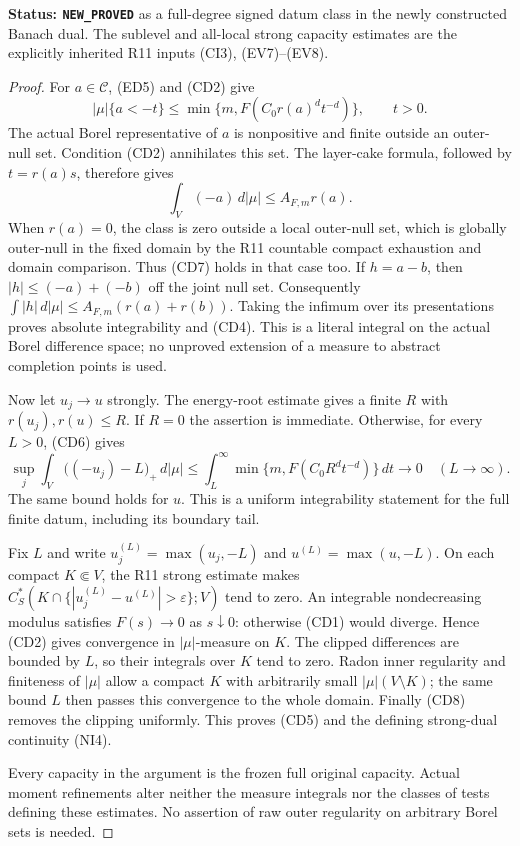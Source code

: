 \noindent\textbf{Status: \texttt{NEW\_PROVED}} as a
full-degree signed datum class in the newly constructed Banach
dual. The sublevel and all-local strong capacity estimates are
the explicitly inherited R11 inputs (CI3), (EV7)--(EV8).

\begin{proof}
For $a\in\mathscr C$, (ED5) and (CD2) give
\[
       |\mu|\{a<-t\}
       \leq \min\{m,F(C_0r(a)^d t^{-d})\},\qquad t>0.
 \tag{CD6}
\]
The actual Borel representative of $a$ is nonpositive and finite
outside an outer-null set. Condition (CD2) annihilates this set.
The layer-cake formula, followed by $t=r(a)s$, therefore gives
\[
                        \int_V(-a)\,d|\mu|
                                      \leq A_{F,m}r(a).
 \tag{CD7}
\]
When $r(a)=0$, the class is zero outside a local outer-null set,
which is globally outer-null in the fixed domain by the R11
countable compact exhaustion and domain comparison. Thus (CD7)
holds in that case too. If $h=a-b$, then
$|h|\leq(-a)+(-b)$ off the joint null set. Consequently
$\int|h|\,d|\mu|\leq A_{F,m}(r(a)+r(b))$. Taking the infimum
over its presentations proves absolute integrability and (CD4).
This is a literal integral on the actual Borel difference space;
no unproved extension of a measure to abstract completion points
is used.

Now let $u_j\to u$ strongly. The energy-root estimate gives a
finite $R$ with $r(u_j),r(u)\leq R$. If $R=0$ the assertion
is immediate. Otherwise, for every $L>0$, (CD6) gives
\[
 \sup_j\int_V\bigl((-u_j)-L\bigr)_+\,d|\mu|
       \leq\int_L^\infty
                  \min\{m,F(C_0R^d t^{-d})\}\,dt
                   \longrightarrow0\quad(L\to\infty).
 \tag{CD8}
\]
The same bound holds for $u$. This is a uniform integrability
statement for the full finite datum, including its boundary tail.

Fix $L$ and write $u_j^{(L)}=\max(u_j,-L)$ and
$u^{(L)}=\max(u,-L)$. On each compact $K\Subset V$, the
R11 strong estimate makes
$C_S^*(K\cap\{|u_j^{(L)}-u^{(L)}|>\varepsilon\};V)$ tend
to zero. An integrable nondecreasing modulus satisfies
$F(s)\to0$ as $s\downarrow0$: otherwise (CD1) would diverge.
Hence (CD2) gives convergence in $|\mu|$-measure on $K$.
The clipped differences are bounded by $L$, so their integrals
over $K$ tend to zero. Radon inner regularity and finiteness of
$|\mu|$ allow a compact $K$ with arbitrarily small
$|\mu|(V\setminus K)$; the same bound $L$ then passes this
convergence to the whole domain. Finally (CD8) removes the
clipping uniformly. This proves (CD5) and the defining
strong-dual continuity (NI4).

Every capacity in the argument is the frozen full original
capacity. Actual moment refinements alter neither the measure
integrals nor the classes of tests defining these estimates.
No assertion of raw outer regularity on arbitrary Borel sets
is needed.
\end{proof}

